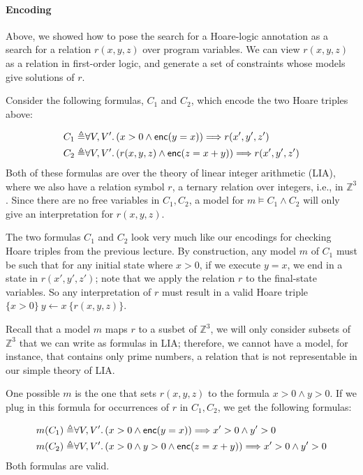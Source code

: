 \documentclass{amsart}
\theoremstyle{definition}
\theoremstyle{remark}
\numberwithin{equation}{section}
\begin{document}
\paragraph{Encoding}
Above, we showed how to pose the search for a Hoare-logic
annotation
as a search for a relation $r(x,y,z)$ over program variables.
We can view $r(x,y,z)$ as a relation in first-order
logic, and generate a set of constraints whose
models give solutions of $r$.

Consider the following formulas, $C_1$ and $C_2$,
which encode the two Hoare triples above:

\begin{align*}
C_1 \triangleq&
  \forall V,V' \ldotp (x > 0 \land \enc(y = x)) \Longrightarrow r(x',y',z')\\
%
C_2 \triangleq&
  \forall V,V' \ldotp   \left(r(x,y,z) \land
  \enc(z = x + y)\right) \Longrightarrow r(x',y',z')
\end{align*}
Both of these formulas
are over the theory of linear integer arithmetic (LIA),
where we also have a relation symbol $r$,
a ternary relation over integers, i.e., in $\mathbb{Z}^3$.
Since there are no free variables in $C_1,C_2$,
a model for $m \models C_1 \land C_2$
will only give an interpretation for $r(x,y,z)$.

The two formulas $C_1$ and $C_2$
look very much like our encodings for checking Hoare triples
from the previous lecture.
By construction, any model $m$ of $C_1$
must be such that for any initial state where $x > 0$,
if we execute $y = x$, we end in a state in $r(x',y',z')$;
note that we apply the relation $r$ to the final-state variables.
So any interpretation of $r$ must result in a valid Hoare triple
$\{x> 0\} ~ y \gets x ~ \{r(x,y,z)\}$.

Recall that a model $m$ maps $r$ to a susbet of $\mathbb{Z}^3$,
we will only consider subsets of $\mathbb{Z}^3$
that we can write as formulas in LIA;
therefore, we cannot have a model, for instance,
that contains only prime numbers, a relation that is not representable in our simple theory of LIA.

One possible $m$ is the one that sets $r(x,y,z)$
to the formula $x > 0 \land y > 0$.
If we plug in this formula for occurrences of
$r$ in $C_1, C_2$, we get the following formulas:

\begin{align*}
m(C_1) \triangleq&
  \forall V,V' \ldotp (x > 0 \land \enc(y = x)) \Longrightarrow x' > 0 \land y' > 0\\
%
m(C_2) \triangleq&
  \forall V,V' \ldotp   \left(x > 0 \land y > 0 \land
  \enc(z = x + y)\right) \Longrightarrow x' > 0 \land y' > 0
\end{align*}
Both formulas are valid.
\end{document}
